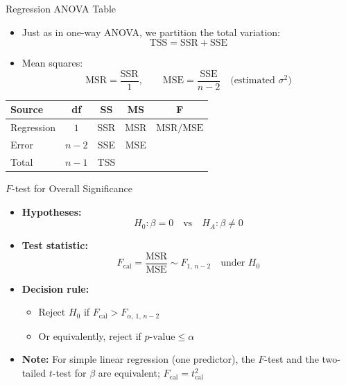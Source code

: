 \documentclass[12pt, aspectratio=169]{beamer}
\begin{document}
    \begin{frame}{Regression ANOVA Table}
        \begin{itemize}
            \item Just as in one-way ANOVA, we partition the total variation:
                \[
                    \text{TSS} = \text{SSR} + \text{SSE}
                \]
            \item Mean squares:
                \[
                    \text{MSR} = \frac{\text{SSR}}{1},
                    \qquad
                    \text{MSE} = \frac{\text{SSE}}{n-2}
                    \quad \text{(estimated } \sigma^2 \text{)}
                \]
        \end{itemize}

        \vspace{0.4em}

        \begin{center}
            \begin{tabular}{lcccc}
                \toprule
                \textbf{Source} & \textbf{df} & \textbf{SS} & \textbf{MS} & \textbf{F} \\
                \midrule
                Regression & $1$   & SSR & MSR & $\text{MSR}/\text{MSE}$ \\
                Error      & $n-2$ & SSE & MSE & \\
                Total      & $n-1$ & TSS & & \\
                \bottomrule
            \end{tabular}
        \end{center}
    \end{frame}


    \begin{frame}{$F$-test for Overall Significance}
        \begin{itemize}
            \item \textbf{Hypotheses:}
                \[
                    H_0: \beta = 0 \quad \text{vs} \quad H_A: \beta \neq 0
                \]
            \item \textbf{Test statistic:}
                \[
                    F_{\text{cal}} = \frac{\text{MSR}}{\text{MSE}}
                    \sim F_{1,\,n-2} \quad \text{under } H_0
                \]
            \item \textbf{Decision rule:}
                \begin{itemize}
                    \item Reject $H_0$ if $F_{\text{cal}} > F_{\alpha,\,1,\,n-2}$
                    \item Or equivalently, reject if $p\text{-value} \leqslant \alpha$
                \end{itemize}
            \item \textbf{Note:} For simple linear regression (one predictor), the $F$-test and the two-tailed $t$-test for $\beta$ are equivalent; $F_{\text{cal}} = t_{\text{cal}}^2$
        \end{itemize}
    \end{frame}
\end{document}

